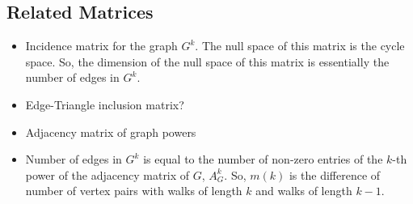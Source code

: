 \documentclass[12pt]{article}
\theoremstyle{definition}
\begin{document}
\subsection{Related Matrices}

\begin{itemize}
	\item Incidence matrix for the graph $G^k$.  The null space of this matrix is the cycle space.  So, the dimension of the null space of this matrix is essentially the number of edges in $G^k$.
	\item Edge-Triangle inclusion matrix?
	\item Adjacency matrix of graph powers
	\item Number of edges in $G^k$ is equal to the number of non-zero entries of the $k$-th power of the adjacency matrix of $G$, $A_G^k$.  So, $m(k)$ is the difference of number of vertex pairs with walks of length $k$ and walks of length $k-1$.
\end{itemize}

\newpage
\end{document}
